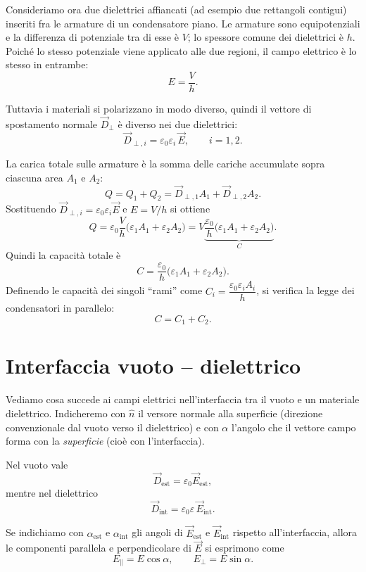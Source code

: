 \documentclass{book}
\begin{document}
Consideriamo ora due dielettrici affiancati (ad esempio due rettangoli contigui) inseriti fra le armature di un condensatore piano. Le armature sono equipotenziali e la differenza di potenziale tra di esse è \(V\); lo spessore comune dei dielettrici è \(h\). Poiché lo stesso potenziale viene applicato alle due regioni, il campo elettrico è lo stesso in entrambe:
\[
E=\frac{V}{h}.
\]

Tuttavia i materiali si polarizzano in modo diverso, quindi il vettore di spostamento normale \(\vec{D}_{\perp}\) è diverso nei due dielettrici:
\[
\vec{D}_{\perp,i}=\varepsilon_0\varepsilon_i\,\vec{E},\qquad i=1,2.
\]

La carica totale sulle armature è la somma delle cariche accumulate sopra ciascuna area \(A_1\) e \(A_2\):
\[
Q=Q_1+Q_2 = \vec{D}_{\perp,1}A_1 + \vec{D}_{\perp,2}A_2.
\]
Sostituendo \(\vec{D}_{\perp,i}=\varepsilon_0\varepsilon_i \vec{E}\) e \(E=V/h\) si ottiene
\[
Q = \varepsilon_0\frac{V}{h}\bigl(\varepsilon_1 A_1 + \varepsilon_2 A_2\bigr)
= V\underbrace{\frac{\varepsilon_0}{h}\bigl(\varepsilon_1 A_1 + \varepsilon_2 A_2\bigr)}_{C}.
\]
Quindi la capacità totale è
\[
C=\frac{\varepsilon_0}{h}\bigl(\varepsilon_1 A_1 + \varepsilon_2 A_2\bigr).
\]
Definendo le capacità dei singoli “rami” come \(C_i=\dfrac{\varepsilon_0\varepsilon_i A_i}{h}\), si verifica la legge dei condensatori in parallelo:
\[
C = C_1 + C_2.
\]

 
\section{Interfaccia vuoto -- dielettrico}

Vediamo cosa succede ai campi elettrici nell'interfaccia tra il vuoto e un materiale dielettrico.  
Indicheremo con \(\hat{n}\) il versore normale alla superficie (direzione convenzionale dal vuoto verso il dielettrico) e con \(\alpha\) l'angolo che il vettore campo forma con la \emph{superficie} (cioè con l'interfaccia).

Nel vuoto vale
\[
\vec{D}_{\mathrm{est}}=\varepsilon_0\vec{E}_{\mathrm{est}},
\]
mentre nel dielettrico 
\[
\vec{D}_{\mathrm{int}}=\varepsilon_0\varepsilon\,\vec{E}_{\mathrm{int}}.
\]

Se indichiamo con \(\alpha_{\text{est}}\) e \(\alpha_{\text{int}}\) gli angoli di \(\vec{E}_{\text{est}}\) e \(\vec{E}_{\text{int}}\) rispetto all'interfaccia, allora le componenti parallela e perpendicolare di \(\vec{E}\) si esprimono come
\[
E_{\parallel}=E\cos\alpha,\qquad E_{\perp}=E\sin\alpha.
\]
\end{document}
